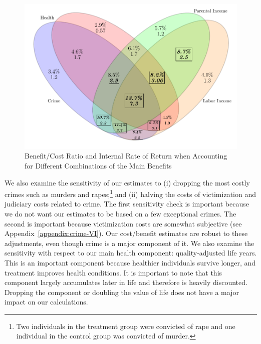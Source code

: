\begin{figure}[!htbp]
\caption{Benefit/Cost Ratio and Internal Rate of Return when Accounting for Different Combinations of the Main Benefits}\label{figure:vennpooled}
\centering
\includegraphics[width=.7\columnwidth]{output/venn_pooled.pdf}
\end{figure}

\noindent We also examine the sensitivity of our estimates to (i) dropping the most costly crimes such as murders and rapes;\footnote{Two individuals in the treatment group were convicted of rape and one individual in the control group was convicted of murder.} and (ii) halving the costs of victimization and judiciary costs related to crime. The first sensitivity check is important because we do not want our estimates to be based on a few exceptional crimes. The second is important because victimization costs are somewhat subjective (see  Appendix~\ref{appendix:crime-VI}). Our cost/benefit estimates are robust to these adjustments, even though crime is a major component of it. We also examine the sensitivity with respect to our main health component: quality-adjusted life years. This is an important component because healthier individuals survive longer, and treatment improves health conditions. It is important to note that this component largely accumulates later in life and therefore is heavily discounted. Dropping the component or doubling the value of life does not have a major impact on our calculations.\\

